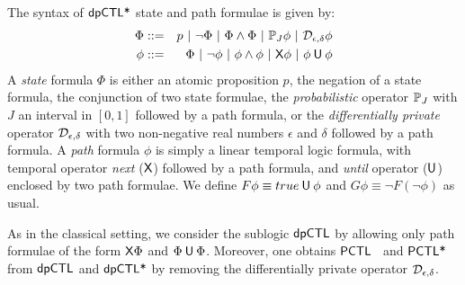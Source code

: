 
The syntax of $\textsf{dpCTL*}$ state and path formulae is given by:
\begin{eqnarray*}
  \Phi & ::= & p \ |\ \neg \Phi \ |\ \Phi \wedge \Phi \ |\
               \PJ{J} \phi \ |\ \dpriv{\epsilon}{\delta} \phi\\
  \phi & ::= & \Phi \ |\ \neg\phi  \ |\  \phi\wedge\phi  \ |\  \X \phi \ |\ \phi \until \phi
\end{eqnarray*}
A \emph{state} formula $\Phi$ is either  an atomic proposition
$p$, the negation of a state formula, the conjunction of two state
formulae, the \emph{probabilistic} operator $\mathbb{P}_{J}$ with $J$
an interval in $[0, 1]$ followed by a path formula, or the
\emph{differentially private} operator $\mathcal{D}_{{\epsilon}, {\delta}}$
 with two non-negative real numbers $\epsilon$ and $\delta$ followed
 by a path formula. A
\emph{path} formula $\phi$ is simply a linear temporal logic formula, with temporal operator \emph{next}  ($\mathsf{X}$) followed by a path formula, 
and  \emph{until} operator
($\mathbin{\mathsf{U}}$) enclosed by two path formulae.
We define $F \phi \equiv true \mathbin{\mathsf{U}} \phi$ and $G\phi \equiv \neg F (\neg\phi)$ as usual.

As in the classical setting, we consider the sublogic $\textsf{dpCTL}$ by allowing only path formulae of the form $\mathsf{X}\Phi$ and $\Phi\mathbin{\mathsf{U}}\Phi$.
Moreover, one obtains $\textsf{PCTL}$~\cite{HanssonJ94} and $\textsf{PCTL*}$~\cite{BiancoA95} from $\textsf{dpCTL}$ and $\textsf{dpCTL*}$
by removing the differentially private operator  $\mathcal{D}_{{\epsilon}, {\delta}}$.

